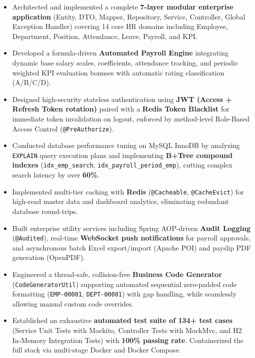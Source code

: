 ﻿\documentclass[11pt,a4paper]{article}
\begin{document}
\begin{itemize}
    \item Architected and implemented a complete \textbf{7-layer modular enterprise application} (Entity, DTO, Mapper, Repository, Service, Controller, Global Exception Handler) covering 14 core HR domains including Employee, Department, Position, Attendance, Leave, Payroll, and KPI.
    \item Developed a formula-driven \textbf{Automated Payroll Engine} integrating dynamic base salary scales, coefficients, attendance tracking, and periodic weighted KPI evaluation bonuses with automatic rating classification (A/B/C/D).
    \item Designed high-security stateless authentication using \textbf{JWT (Access + Refresh Token rotation)} paired with a \textbf{Redis Token Blacklist} for immediate token invalidation on logout, enforced by method-level Role-Based Access Control (\texttt{@PreAuthorize}).
    \item Conducted database performance tuning on MySQL InnoDB by analyzing \texttt{EXPLAIN} query execution plans and implementing \textbf{B+Tree compound indexes} (\texttt{idx\_emp\_search}, \texttt{idx\_payroll\_period\_emp}), cutting complex search latency by over \textbf{60\%}.
    \item Implemented multi-tier caching with \textbf{Redis} (\texttt{@Cacheable}, \texttt{@CacheEvict}) for high-read master data and dashboard analytics, eliminating redundant database round-trips.
    \item Built enterprise utility services including Spring AOP-driven \textbf{Audit Logging} (\texttt{@Audited}), real-time \textbf{WebSocket push notifications} for payroll approvals, and asynchronous batch Excel export/import (Apache POI) and payslip PDF generation (OpenPDF).
    \item Engineered a thread-safe, collision-free \textbf{Business Code Generator} (\texttt{CodeGeneratorUtil}) supporting automated sequential zero-padded code formatting (\texttt{EMP-00001}, \texttt{DEPT-00001}) with gap handling, while seamlessly allowing manual custom code overrides.
    \item Established an exhaustive \textbf{automated test suite of 134+ test cases} (Service Unit Tests with Mockito, Controller Tests with MockMvc, and H2 In-Memory Integration Tests) with \textbf{100\% passing rate}. Containerized the full stack via multi-stage Docker and Docker Compose.
\end{itemize}
\end{document}
